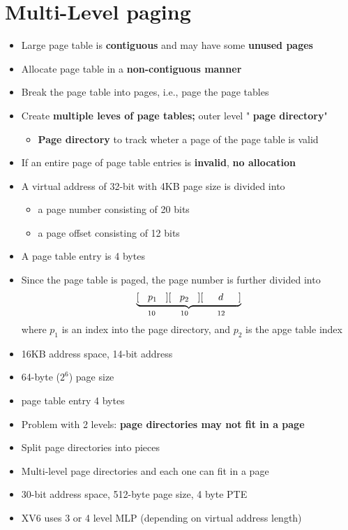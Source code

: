 \documentclass[a4paper,11pt,english]{article}
\begin{document}
\section*{Multi-Level paging}
\begin{itemize}
    \item Large page table is \textbf{\color{blue} contiguous} and may have some \textbf{\color{red} unused pages}
    \item Allocate page table in a \textbf{\color{blue} non-contiguous manner}
    \item Break the page table into pages, i.e., page the page tables
    \item Create \textbf{\color{blue} multiple leves of page tables;} outer level "\textbf{\color{blue} page directory}"
        \begin{itemize}
            \item \textbf{\color{blue} Page directory} to track wheter a page of the page table is valid
        \end{itemize}
    \item If an entire page of page table entries is \textbf{\color{red} invalid}, \textbf{\color{red} no allocation}  
    \item A virtual address of 32-bit with 4KB page size is divided into
        \begin{itemize}
            \item a page number consisting of 20 bits
            \item a page offset consisting of 12 bits
        \end{itemize}
    \item A page table entry is 4 bytes
    \item Since the page table is paged, the page number is further divided into
        \[
            \underbrace{[\:\:\:\:p_1\:\:\:\:][\:\:\:\:p_2\:\:\:\:][\:\:\:\:\:\:\:d\:\:\:\:\:\:\:]}_{\text{10 \hphantom{0.5cm} 10 \hphantom{0.55cm} 12 \hphantom{|}}}
        \]
        where $p_1$ is an index into the page directory, and $p_2$ is the apge table index
    \item 16KB address space, 14-bit address
    \item 64-byte ($2^6$) page size
    \item page table entry 4 bytes
    \item Problem with 2 levels: \textbf{\color{red} page directories may not fit in a page}
    \item Split page directories into pieces
    \item Multi-level page directories and each one can fit in a page
    \item 30-bit address space, 512-byte page size, 4 byte PTE
    \item XV6 uses 3 or 4 level MLP (depending on virtual address length)
\end{itemize}
\end{document}
